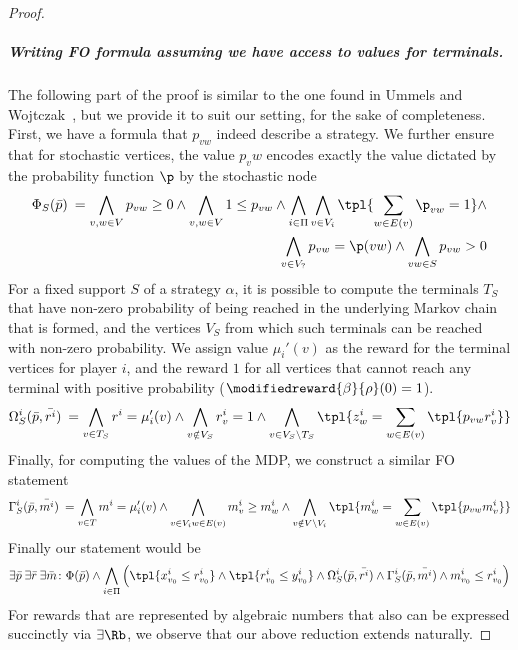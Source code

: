 \begin{proof}
        
     \subparagraph*{Writing FO formula assuming we have access to values for terminals.}
    The following part of the proof is similar to the one found in Ummels and Wojtczak~\cite[Theorem 4.5]{UW11}, but we provide it to suit our setting, for the sake of completeness. 
    First, we have a formula that  $p_{vw}$ indeed describe a strategy. We further ensure that for stochastic vertices, the value $p_vw$ encodes exactly the value dictated by the probability function $\p$ by the stochastic node
    \begin{align*}
    \Phi_S(\Bar{p})\:= \bigwedge_{v,w\in V}p_{vw}\geq 0\land \bigwedge_{v,w\in V}1\leq p_{vw}
    \land \bigwedge_{i\in \Pi}\bigwedge_{v\in V_i} \tpl{\sum_{w\in E(v)}\p_{vw}=1}\land \\
    \bigwedge_{v\in V_?}p_{vw} =  \p(vw)\land \bigwedge_{vw\in S}p_{vw}> 0 
    \end{align*}
    For a fixed support $S$ of a strategy $\alpha$, it is possible to compute the terminals $T_S$ that have non-zero probability of being reached in the underlying Markov chain that is formed, and the vertices $V_S$ from which such terminals can be reached with non-zero probability. We assign value $\mu_i'(v)$ as the reward for the terminal vertices for player $i$, and the reward $1$ for all vertices that cannot reach any terminal with positive probability ($\modifiedreward{\beta}{\rho}(0) = 1$).
    \[\Omega_S^i(\Bar{p},\Bar{r^i})\:= \bigwedge_{v\in T_S} r^i =\mu_i'(v) \land
                 \bigwedge_{v\notin V_S} r^i_v = 1 \land
                 \bigwedge_{v\in V_S\setminus T_S} \tpl{z^i_w = \sum_{w\in E(v)}\tpl{ p_{vw} r^i_v}}
                 \]     
    Finally, for computing the values of the MDP, we construct a similar FO statement
    \[\Gamma_S^i(\Bar{p},\Bar{m^i}) \:= \bigwedge_{v\in T} m^i =\mu_i'(v) \land
                 \bigwedge_{v\in V_i\\w\in E(v)} m_v^i\geq m_w^i \land
                 \bigwedge_{v\notin V\setminus V_i} \tpl{m^i_w = \sum_{w\in E(v)}\tpl{ p_{vw} m^i_v}}\]
Finally our statement would be $$\exists \Bar{p}\:\exists\Bar{r}\:\exists\Bar{m}\colon \Phi(\Bar{p})\land \bigwedge_{i\in\Pi}\left(\tpl{x^i_{v_0}\leq r^i_{v_0}}\land \tpl{r^i_{v_0}\leq y^i_{v_0}}\land\Omega_S^i(\Bar{p},\Bar{r^i})\land \Gamma_S^i(\Bar{p},\Bar{m^i})\land m_{v_0}^i\leq r_{v_0}^i \right)$$
For rewards that are represented by algebraic numbers that also can be expressed succinctly via $\exists\Rb$, we observe that our above reduction extends naturally. 

\end{proof}


